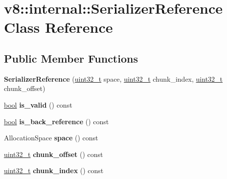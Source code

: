 \hypertarget{classv8_1_1internal_1_1SerializerReference}{}\section{v8\+:\+:internal\+:\+:Serializer\+Reference Class Reference}
\label{classv8_1_1internal_1_1SerializerReference}
\subsection*{Public Member Functions}
\begin{DoxyCompactItemize}
\item 
\mbox{\label{classv8_1_1internal_1_1SerializerReference_ad50c3c1ee1f49ccbf130480c153797d3}} 
{\bfseries Serializer\+Reference} (\mbox{\hyperlink{classuint32__t}{uint32\+\_\+t}} space, \mbox{\hyperlink{classuint32__t}{uint32\+\_\+t}} chunk\+\_\+index, \mbox{\hyperlink{classuint32__t}{uint32\+\_\+t}} chunk\+\_\+offset)
\item 
\mbox{\label{classv8_1_1internal_1_1SerializerReference_a468dd3931a00c87b9a90e7fbf9ddc2c0}} 
\mbox{\hyperlink{classbool}{bool}} {\bfseries is\+\_\+valid} () const
\item 
\mbox{\label{classv8_1_1internal_1_1SerializerReference_a686441c62c3a91c539cf72f0cb6d83f7}} 
\mbox{\hyperlink{classbool}{bool}} {\bfseries is\+\_\+back\+\_\+reference} () const
\item 
\mbox{\label{classv8_1_1internal_1_1SerializerReference_ab97785dcaae3785497478dbc4f496704}} 
Allocation\+Space {\bfseries space} () const
\item 
\mbox{\label{classv8_1_1internal_1_1SerializerReference_aa10cb07952c2260687eeb2cdb2961c8f}} 
\mbox{\hyperlink{classuint32__t}{uint32\+\_\+t}} {\bfseries chunk\+\_\+offset} () const
\item 
\mbox{\label{classv8_1_1internal_1_1SerializerReference_a96d2109c0e0380690e5d76d8d2d4197d}} 
\mbox{\hyperlink{classuint32__t}{uint32\+\_\+t}} {\bfseries chunk\+\_\+index} () const

\end{DoxyCompactItemize}
